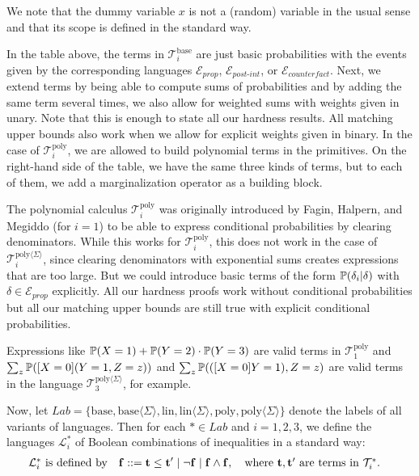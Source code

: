\documentclass[a4paper,UKenglish,cleveref, autoref, thm-restate]{lipics-v2021}
\newcommand{\compactEquals}[1]{\let\IsInPP=1#1\let\IsInPP=\relax}
\newcommand{\PP}[1]{\mathbb{P}(\compactEquals{#1})}
\newcommand{\cL}{{\mathcal L}}
\newcommand{\cE}{{\mathcal E}}
\newcommand{\cT}{{\mathcal T}}
\newcommand{\bff}{{\bf f}}
\newcommand{\bt}{{\bf t}}
\def\Eprop{\cE_{\textit{prop}}}
\def\Epint{\cE_{\textit{post-int}}}
\def\Ecounter{\cE_{\textit{counterfact}}}
\def\probname#1#2{^{\text{#1}}_{\text{#2}}}
\def\probnamesum#1#2{^{\text{#1}{\langle{\scriptscriptstyle\Sigma}\rangle}}_{\text{#2}}}
\def\Tprobpoly{\cT\probname{poly}{1}}
\def\Tcausalpolysum{\cT\probnamesum{poly}{3}}
\def\Tipolysum{\cT\probnamesum{poly}{$i$}}
\def\Tipoly{\cT\probname{poly}{$i$}}
\def\Ticomp{\cT\probname{base}{$i$}}
\def\Listar{\cL^{*}_{i}}
\def\Lab{\textit{Lab}}
\def\mmid{ | }
\begin{document}
We note that the dummy variable $x$ is not a (random) variable in the usual sense
and that its scope is defined in the standard way.


In the table above, the terms in $\Ticomp$ are just basic probabilities with the events given by the corresponding languages $\Eprop$, $\Epint$, or $\Ecounter$. 
Next, we extend terms by being able to compute sums of probabilities and by 
adding the same term several times, we also allow for weighted sums with 
weights given in unary. Note that this is enough to state all our hardness
results. All matching upper bounds 
also work when we allow for explicit weights given in binary.
In the case of $\Tipoly$, we are allowed to build polynomial terms in the 
primitives. On the right-hand side of the table, we have the same
three kinds of terms, but to each of them, we add a marginalization operator
as a building block.

The polynomial calculus $\Tipoly$ was originally introduced by Fagin, Halpern, and Megiddo \citep{fagin1990logic}
(for $i = 1$) 
to be able to express conditional probabilities by clearing denominators. While this works 
for $\Tipoly$, this does not work in the case of $\Tipolysum$,
since clearing denominators with exponential sums creates expressions that
are too large. But we could introduce basic terms 
of the form $\PP{\delta_i \mmid \delta}$ with $\delta \in \Eprop$
explicitly. All our hardness proofs work without conditional probabilities
but all our matching upper bounds are still true with explicit
conditional probabilities.


Expressions like
$\PP{X=1} + \PP{Y=2} \cdot \PP{Y=3}$
are valid terms in $\Tprobpoly$ and 
$\sum_z\PP{[X=0](Y=1, Z=z)}$ and $\sum_z\PP{([X=0]Y=1), Z=z}$ are
valid terms in the language  
$\Tcausalpolysum$, for example.  



Now, let 
$
\Lab= \{
\text{base}, \text{base}\langle{\Sigma}\rangle, 
\text{lin}, \text{lin}\langle{\Sigma}\rangle,     
\text{poly}, \text{poly}\langle{\Sigma}\rangle
\}
$
denote the labels of all variants of languages. Then for each   $*\in\Lab$ and $i=1,2,3$, we define
the languages $\Listar$ of Boolean combinations of inequalities in a standard way: 
\begin{align*}
   & \mbox{$\Listar$ is defined by}\quad  \bff ::= \bt \le \bt' \mid \neg \bff \mid \bff \wedge \bff , \quad
    \mbox{where $ \bt,\bt'$ are terms in  $ {\cal T}^{*}_{i} $.}
\end{align*}
\end{document}
